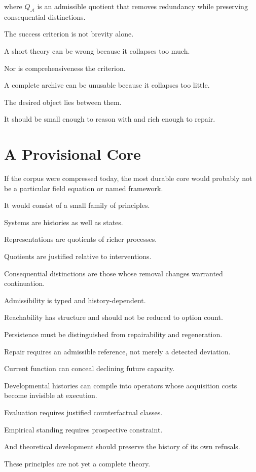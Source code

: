 \documentclass[11pt]{article}
\theoremstyle{remark}
\newcommand{\Adm}{\mathcal{A}}
\begin{document}
where $Q_{\Adm}$ is an admissible quotient that removes redundancy while
preserving consequential distinctions.

The success criterion is not brevity alone.

A short theory can be wrong because it collapses too much.

Nor is comprehensiveness the criterion.

A complete archive can be unusable because it collapses too little.

The desired object lies between them.

It should be small enough to reason with and rich enough to repair.

\section{A Provisional Core}

If the corpus were compressed today, the most durable core would probably not
be a particular field equation or named framework.

It would consist of a small family of principles.

Systems are histories as well as states.

Representations are quotients of richer processes.

Quotients are justified relative to interventions.

Consequential distinctions are those whose removal changes warranted
continuation.

Admissibility is typed and history-dependent.

Reachability has structure and should not be reduced to option count.

Persistence must be distinguished from repairability and regeneration.

Repair requires an admissible reference, not merely a detected deviation.

Current function can conceal declining future capacity.

Developmental histories can compile into operators whose acquisition costs
become invisible at execution.

Evaluation requires justified counterfactual classes.

Empirical standing requires prospective constraint.

And theoretical development should preserve the history of its own refusals.

These principles are not yet a complete theory.
\end{document}
